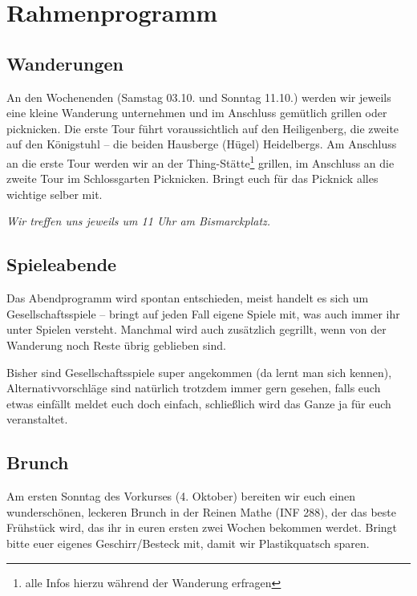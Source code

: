 \section{Rahmenprogramm}
\subsection{Wanderungen}
An den Wochenenden (Samstag 03.10. und Sonntag 11.10.) werden wir jeweils eine kleine Wanderung unternehmen und im Anschluss gemütlich grillen oder picknicken. Die erste Tour führt voraussichtlich auf den Heiligenberg, die zweite auf den Königstuhl -- die beiden Hausberge (Hügel) Heidelbergs. Am Anschluss an die erste Tour werden wir an der Thing-Stätte\footnote{alle Infos hierzu während der Wanderung erfragen} grillen, im Anschluss an die zweite Tour im Schlossgarten Picknicken. Bringt euch für das Picknick alles wichtige selber mit.

\noindent\emph{Wir treffen uns jeweils um 11 Uhr am Bismarckplatz.}

\subsection{Spieleabende}
Das Abendprogramm wird spontan entschieden, meist handelt es sich um Gesellschaftsspiele -- bringt auf jeden Fall eigene Spiele mit, was auch immer ihr unter Spielen versteht. Manchmal wird auch zusätzlich gegrillt, wenn von der Wanderung noch Reste übrig geblieben sind.

Bisher sind Gesellschaftsspiele super angekommen (da lernt man sich kennen), Alternativvorschläge sind natürlich trotzdem immer gern gesehen, falls euch etwas einfällt meldet euch doch einfach, schließlich wird das Ganze ja für euch veranstaltet.

\subsection{Brunch}
Am ersten Sonntag des Vorkurses (4. Oktober) bereiten wir euch einen wunderschönen, leckeren Brunch in der Reinen Mathe (\gls{INF} 288), der das beste Frühstück wird, das ihr in euren ersten zwei Wochen bekommen werdet. Bringt bitte euer eigenes Geschirr/Besteck mit, damit wir Plastikquatsch sparen.

